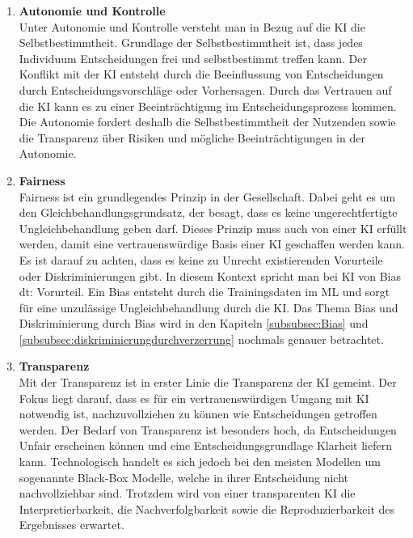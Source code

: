 \begin{onehalfspace}
        \begin{enumerate}
            \item \textbf{Autonomie und Kontrolle} \\
            Unter Autonomie und Kontrolle versteht man in Bezug auf die \ac*{KI} die Selbstbestimmtheit. Grundlage der Selbstbestimmtheit ist, dass jedes Individuum Entscheidungen frei und selbstbestimmt treffen kann. Der Konflikt mit der \ac*{KI} entsteht durch die Beeinflussung von Entscheidungen durch Entscheidungsvorschläge oder Vorhersagen. Durch das Vertrauen auf die \ac*{KI} kann es zu einer Beeinträchtigung im Entscheidungsprozess kommen. Die Autonomie fordert deshalb die Selbstbestimmtheit der Nutzenden sowie die Transparenz über Risiken und mögliche Beeinträchtigungen in der Autonomie.\cite{Cremers2019}\cite{Heesen2020}
            \item \textbf{Fairness} \\
            Fairness ist ein grundlegendes Prinzip in der Gesellschaft. Dabei geht es um den Gleichbehandlungsgrundsatz, der besagt, dass es keine ungerechtfertigte Ungleichbehandlung geben darf. Dieses Prinzip muss auch von einer \ac*{KI} erfüllt werden, damit eine vertrauenswürdige Basis einer \ac*{KI} geschaffen werden kann. Es ist darauf zu achten, dass es keine zu Unrecht existierenden Vorurteile oder Diskriminierungen gibt. In diesem Kontext spricht man bei \ac*{KI} von Bias \glqq{}\ac*{dt}: Vorurteil\grqq{}. Ein Bias entsteht durch die Trainingsdaten im \ac*{ML} und sorgt für eine unzulässige Ungleichbehandlung durch die \ac*{KI}. Das Thema Bias und Diskriminierung durch Bias wird in den Kapiteln \ref*{subsubsec:Bias} und \ref*{subsubsec:diskriminierungdurchverzerrung} nochmals genauer betrachtet.\cite{Cremers2019}\cite{hagendorff2021blind}
            \item \textbf{Transparenz} \\
            Mit der Transparenz ist in erster Linie die Transparenz der \ac*{KI} gemeint. Der Fokus liegt darauf, dass es für ein vertrauenswürdigen Umgang mit \ac*{KI} notwendig ist, nachzuvollziehen zu können wie Entscheidungen getroffen werden. Der Bedarf von Transparenz ist besonders hoch, da Entscheidungen Unfair erscheinen können und eine Entscheidungsgrundlage Klarheit liefern kann. Technologisch handelt es sich jedoch bei den meisten Modellen um sogenannte Black-Box Modelle, welche in ihrer Entscheidung nicht nachvollziehbar sind. Trotzdem wird von einer transparenten \ac*{KI} die Interpretierbarkeit, die Nachverfolgbarkeit sowie die Reproduzierbarkeit des Ergebnisses erwartet.\cite{Cremers2019}\cite{Hallensleben2020}\cite{Heesen2020}

\end{enumerate}
\end{onehalfspace}
